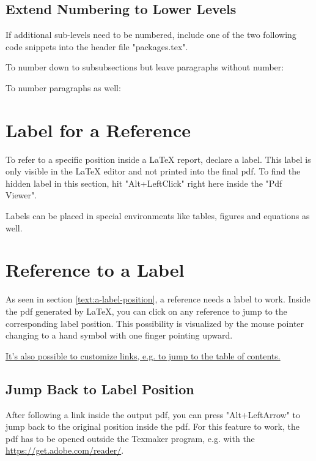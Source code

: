 \subsection{Extend Numbering to Lower Levels}

If additional sub-levels need to be numbered, include one of the two following code snippets into the header file "packages.tex".

To number down to subsubsections but leave paragraphs without number:


To number paragraphs as well:



\section{Label for a Reference}

To refer to a specific position inside a LaTeX report, declare a label.
\label{text:a-label-position}
This label is only visible in the LaTeX editor and not printed into the final pdf. To find the hidden label in this section, hit "Alt+LeftClick" right here inside the "Pdf Viewer".

Labels can be placed in special environments like tables, figures and equations as well.

\section{Reference to a Label}

As seen in section \ref{text:a-label-position}, a reference needs a label to work.
Inside the pdf generated by LaTeX, you can click on any reference to jump to the corresponding label position.
This possibility is visualized by the mouse pointer changing to a hand symbol with one finger pointing upward.

\hyperlink{toc:label}{It's also possible to customize links, e.g. to jump to the table of contents.}

\subsection{Jump Back to Label Position}

After following a link inside the output pdf, you can press "Alt+LeftArrow" to jump back to the original position inside the pdf.
For this feature to work, the pdf has to be opened outside the Texmaker program, e.g. with the \url{https://get.adobe.com/reader/}.


